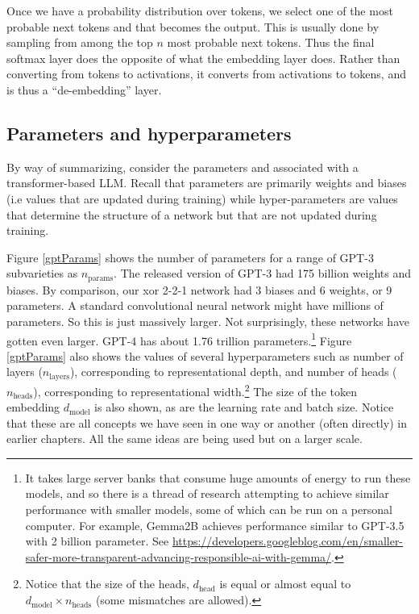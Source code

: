 Once we have a probability distribution over tokens, we select one of the most
probable next tokens and that becomes the output. This is usually done by
sampling from among the top $n$ most probable next tokens. Thus the final
softmax layer does the opposite of what the embedding layer does. Rather than
converting from tokens to activations, it converts from activations to tokens,
and is thus a ``de-embedding'' layer.

\subsection{Parameters and hyperparameters}

By way of summarizing, consider the parameters and  
associated with a transformer-based LLM. Recall that parameters are primarily
weights and biases (i.e values that are updated during training) while
hyper-parameters are values that determine the structure of a network but that
are not updated during training.

Figure \ref{gptParams} shows the  number of parameters for a range of GPT-3
subvarieties as $n_\text{params}$. The released version of GPT-3 had 175
billion weights and biases. By comparison, our xor 2-2-1 network had 3 biases
and 6 weights, or 9 parameters. A standard convolutional neural network might
have millions of parameters. So this is just massively larger. Not
surprisingly, these networks have gotten even larger. GPT-4 has about 1.76
trillion parameters.\footnote{It takes large server banks that  consume huge
amounts of energy to run these models, and so there is a thread of research
attempting to achieve similar performance with smaller models, some of which
can be run on a  personal computer. For example, Gemma2B achieves performance
similar to GPT-3.5 with 2 billion parameter. See
\url{https://developers.googleblog.com/en/smaller-safer-more-transparent-advancing-responsible-ai-with-gemma/}.}
Figure \ref{gptParams} also shows the values of several hyperparameters such as
number of layers ($n_\text{layers}$), corresponding to representational depth,
and number of heads ($n_\text{heads}$), corresponding to representational
width.\footnote{Notice that the size of the heads, $d_\text{head}$ is equal or
almost equal to  $d_\text{model} \times n_\text{heads}$ (some mismatches are
allowed).} The size of the token embedding  $d_\text{model}$ is also shown, as
are the learning rate and batch size. Notice that these are all concepts we
have seen in one way or another (often directly) in earlier chapters. All the
same ideas are being used but on a larger scale.


